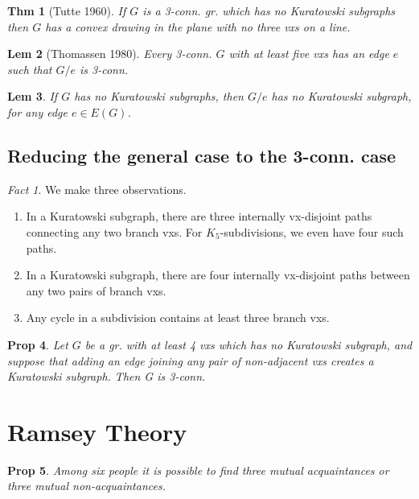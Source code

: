 \documentclass[11pt, fleqn, a4paper, landscape]{article}
\theoremstyle{plain} %
\newtheorem{thm}{Thm}
\newtheorem{lem}[thm]{Lem}
\newtheorem{pro}[thm]{Prop}
\theoremstyle{remark} %
\newtheorem{fact}{Fact}
\theoremstyle{definition} %
\newtheorem{defi}[thm]{Def}
\begin{document}
\begin{multicols}{5}
\begin{thm}[Tutte 1960]
If $G$ is a 3-conn. gr. which has no Kuratowski subgraphs then
$G$ has a convex drawing in the plane with no three vxs on a line.
\end{thm}

\begin{lem}[Thomassen 1980]
Every 3-conn. $G$ with at least five vxs has an edge
$e$ such that $G\slash e$ is 3-conn.
\end{lem}

\begin{lem}
If $G$ has no Kuratowski subgraphs, then $G\slash e$ has no Kuratowski subgraph, for any edge $e\in E(G)$.
\end{lem}

\subsection{Reducing the general case to the 3-conn. case}

\addtocounter{thm}{2}
\begin{fact}
We make three observations. 
\begin{enumerate}
\item  In a Kuratowski subgraph, there are three internally vx-disjoint paths connecting any two
branch vxs. For $K_5$-subdivisions, we even have four such paths.
\item In a Kuratowski subgraph, there are four internally vx-disjoint paths between any two pairs
of branch vxs.
\item Any cycle in a subdivision contains at least three branch vxs.
\end{enumerate}
\end{fact}

\begin{pro}
Let $G$ be a gr. with at least 4 vxs which has no Kuratowski subgraph, and suppose that adding an edge joining any pair of non-adjacent vxs creates a Kuratowski subgraph.
Then G is 3-conn.
\end{pro}

\section{Ramsey Theory}

\begin{pro}
Among six people it is possible to find three mutual acquaintances or three mutual non-acquaintances.
\end{pro}


\end{multicols}
\end{document}

